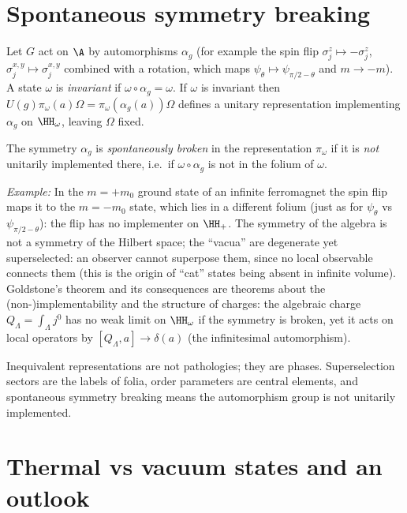 \section{Spontaneous symmetry breaking}

Let $G$ act on $\A$ by automorphisms $\alpha_g$ (for example the spin flip $\sigma^z_j\mapsto-\sigma^z_j$, $\sigma^{x,y}_j\mapsto\sigma^{x,y}_j$ combined with a rotation, which maps $\psi_\theta\mapsto\psi_{\pi/2-\theta}$ and $m\to-m$). A state $\omega$ is \emph{invariant} if $\omega\circ\alpha_g=\omega$. If $\omega$ is invariant then $U(g)\pi_\omega(a)\Omega=\pi_\omega(\alpha_g(a))\Omega$ defines a unitary representation implementing $\alpha_g$ on $\HH_\omega$, leaving $\Omega$ fixed.

\begin{definition}
The symmetry $\alpha_g$ is \emph{spontaneously broken} in the representation $\pi_\omega$ if it is \emph{not} unitarily implemented there, i.e.\ if $\omega\circ\alpha_g$ is not in the folium of $\omega$.
\end{definition}

\emph{Example:} In the $m=+m_0$ ground state of an infinite ferromagnet the spin flip maps it to the $m=-m_0$ state, which lies in a different folium (just as for $\psi_\theta$ vs $\psi_{\pi/2-\theta}$): the flip has no implementer on $\HH_+$. The symmetry of the algebra is not a symmetry of the Hilbert space; the ``vacua'' are degenerate yet superselected: an observer cannot superpose them, since no local observable connects them (this is the origin of ``cat'' states being absent in infinite volume). Goldstone's theorem and its consequences are theorems about the (non-)implementability and the structure of charges: the algebraic charge $Q_\Lambda=\int_\Lambda j^0$ has no weak limit on $\HH_\omega$ if the symmetry is broken, yet it acts on local operators by $[Q_\Lambda,a]\to\delta(a)$ (the infinitesimal automorphism).

\begin{keyidea}
Inequivalent representations are not pathologies; they are phases. Superselection sectors are the labels of folia, order parameters are central elements, and spontaneous symmetry breaking means the automorphism group is not unitarily implemented.
\end{keyidea}

\section{Thermal vs vacuum states and an outlook}

